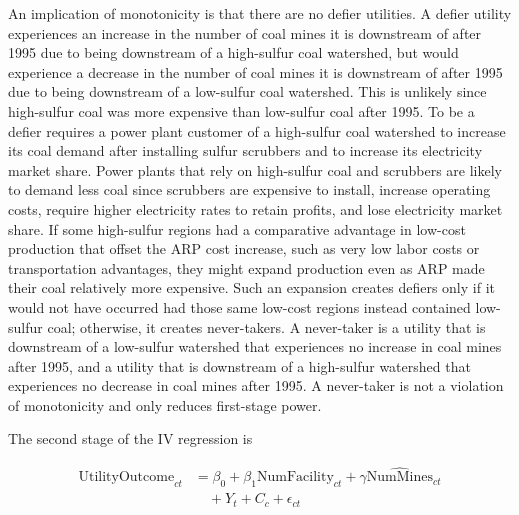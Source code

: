 \documentclass[12pt]{article}
\begin{document}
An implication of monotonicity is that there are no defier utilities. A defier utility experiences an increase in the number of coal mines it is downstream of after 1995 due to being downstream of a high-sulfur coal watershed, but would experience a decrease in the number of coal mines it is downstream of after 1995 due to being downstream of a low-sulfur coal watershed. This is unlikely since high-sulfur coal was more expensive than low-sulfur coal after 1995. To be a defier requires a power plant customer of a high-sulfur coal watershed to increase its coal demand after installing sulfur scrubbers and to increase its electricity market share. Power plants that rely on high-sulfur coal and scrubbers are likely to demand less coal since scrubbers are expensive to install, increase operating costs, require higher electricity rates to retain profits, and lose electricity market share. If some high-sulfur regions had a comparative advantage in low-cost production that offset the ARP cost increase, such as very low labor costs or transportation advantages, they might expand production even as ARP made their coal relatively more expensive. Such an expansion creates defiers only if it would not have occurred had those same low-cost regions instead contained low-sulfur coal; otherwise, it creates never-takers. A never-taker is a utility that is downstream of a low-sulfur watershed that experiences no increase in coal mines after 1995, and a utility that is downstream of a high-sulfur watershed that experiences no decrease in coal mines after 1995. A never-taker is not a violation of monotonicity and only reduces first-stage power. 


The second stage of the IV regression is

\begin{equation}\label{2ndstage2sls}
\begin{split}
\text{UtilityOutcome}_{ct} &= \beta_0 + \beta_1\text{NumFacility}_{ct} + \gamma\widehat{\text{NumMines}}_{ct} \\
&\quad + Y_t + C_c + \epsilon_{ct}
\end{split}
\end{equation}
\end{document}

